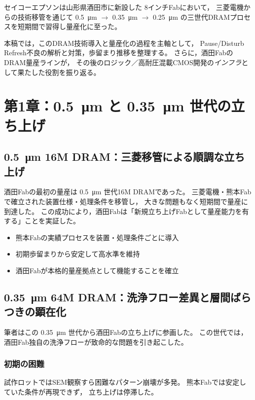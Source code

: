 \documentclass[conference]{IEEEtran}
\let\meter\metre
\begin{document}
セイコーエプソンは山形県酒田市に新設した 8インチFabにおいて，
三菱電機からの技術移管を通じて
\SI{0.5}{\micro\meter} $\rightarrow$ \SI{0.35}{\micro\meter} $\rightarrow$ \SI{0.25}{\micro\meter}
の三世代DRAMプロセスを短期間で習得し量産化に至った。

本稿では，このDRAM技術導入と量産化の過程を主軸として，
Pause/Disturb Refresh不良の解析と対策，歩留まり推移を整理する。
さらに，酒田FabのDRAM量産ラインが，
その後のロジック／高耐圧混載CMOS開発の\emph{インフラ}として果たした役割を振り返る。

\section{第1章：\texorpdfstring{\SI{0.5}{\micro\meter}}{0.5µm} と 
\texorpdfstring{\SI{0.35}{\micro\meter}}{0.35µm} 世代の立ち上げ}

\subsection{\SI{0.5}{\micro\meter} 16M DRAM：三菱移管による順調な立ち上げ}
酒田Fabの最初の量産は \SI{0.5}{\micro\meter} 世代16M DRAMであった。
三菱電機・熊本Fabで確立された装置仕様・処理条件を移管し，
大きな問題もなく短期間で量産に到達した。
この成功により，酒田Fabは「新規立ち上げFabとして量産能力を有する」ことを実証した。

\begin{itemize}
  \item 熊本Fabの実績プロセスを装置・処理条件ごとに導入
  \item 初期歩留まりから安定して高水準を維持
  \item 酒田Fabが本格的量産拠点として機能することを確立
\end{itemize}

\subsection{\SI{0.35}{\micro\meter} 64M DRAM：洗浄フロー差異と層間ばらつきの顕在化}
筆者はこの \SI{0.35}{\micro\meter} 世代から酒田Fabの立ち上げに参画した。  
この世代では，酒田Fab独自の洗浄フローが致命的な問題を引き起こした。

\subsubsection*{初期の困難}
試作ロットではSEM観察すら困難なパターン崩壊が多発。
熊本Fabでは安定していた条件が再現できず，
立ち上げは停滞した。
\end{document}
